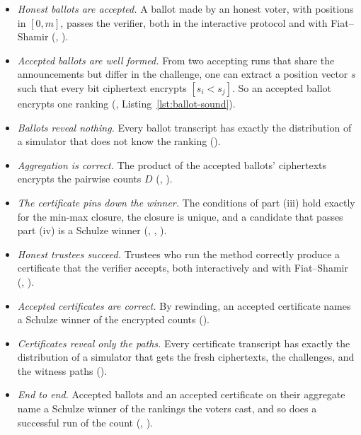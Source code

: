 \begin{itemize}\setlength{\itemsep}{0pt}
  \item \emph{Honest ballots are accepted.} A ballot made by an honest
  voter, with positions in $[0,m]$, passes the verifier, both in the
  interactive protocol and with Fiat--Shamir (,
  ).
  \item \emph{Accepted ballots are well formed.} From two accepting runs
  that share the announcements but differ in the challenge, one can
  extract a position vector $s$ such that every bit ciphertext encrypts
  $[s_i < s_j]$. So an accepted ballot encrypts one ranking
  (, Listing~\ref{lst:ballot-sound}).
  \item \emph{Ballots reveal nothing.} Every ballot transcript has exactly
  the distribution of a simulator that does not know the ranking
  ().
  \item \emph{Aggregation is correct.} The product of the accepted
  ballots' ciphertexts encrypts the pairwise counts $D$
  (, ).
  \item \emph{The certificate pins down the winner.} The conditions of
  part (iii) hold exactly for the min-max closure, the closure is unique,
  and a candidate that passes part (iv) is a Schulze winner
  (, , ).
  \item \emph{Honest trustees succeed.} Trustees who run the method
  correctly produce a certificate that the verifier accepts, both
  interactively and with Fiat--Shamir (,
  ).
  \item \emph{Accepted certificates are correct.} By rewinding, an
  accepted certificate names a Schulze winner of the encrypted counts
  ().
  \item \emph{Certificates reveal only the paths.} Every certificate
  transcript has exactly the distribution of a simulator that gets the
  fresh ciphertexts, the challenges, and the witness paths
  ().
  \item \emph{End to end.} Accepted ballots and an accepted certificate
  on their aggregate name a Schulze winner of the rankings the voters
  cast, and so does a successful run of the count
  (, ).
\end{itemize}

